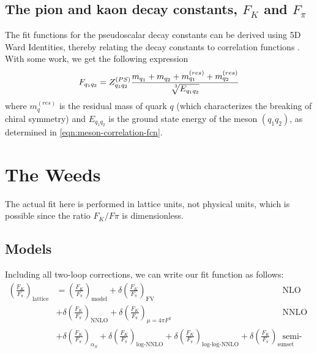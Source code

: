 \documentclass[prd,tightenlines,preprintnumbers,showpacs,superscriptaddress,notitlepage,eqsecnum,floatfix,notitlepage]{revtex4-1}
\begin{document}
\subsection{The pion and kaon decay constants, $F_K$ and $F_\pi$}
The fit functions for the pseudoscalar decay constants can be derived using 5D Ward Identities, thereby relating the decay constants to correlation functions \cite{Berkowitz:2017opd}. With some work, we get the following expression
\begin{equation}
F_{q_1 q_2} = Z^{(PS)}_{q_1 q_2}\frac{m_{q_1} + m_{q_2} + m^{(res)}_{q_1} + m^{(res)}_{q_2} }{\sqrt[\leftroot{-3}\uproot{3}3]{E_{q_1 q_2}}}
\end{equation}
where $m^{(res)}_q$ is the residual mass of quark $q$ (which characterizes the breaking of chiral symmetry) and $E_{q_1 q_2}$ is the ground state energy of the meson $(q_1 q_2)$, as determined in \eqref{eqn:meson-correlation-fcn}.



\section{The Weeds}
The actual fit here is performed in lattice units, not physical units, which is possible since the ratio $F_K / F\pi$ is dimensionless.

\subsection{Models}
Including all two-loop corrections, we can write our fit function as follows:
\begin{align}
\left(\frac{F_K}{F_\pi}\right)_\text{lattice} &=
\left(\frac{F_K}{F_\pi}\right)_\text{model}  + \delta \left(\frac{F_K}{F_\pi}\right)_\text{FV} 
&& \text{NLO + F.V.} \\
&+ \delta \left(\frac{F_K}{F_\pi}\right)_\text{NNLO}  + \delta \left(\frac{F_K}{F_\pi}\right)_{\mu = 4 \pi F^2} 
&& \text{NNLO} \nonumber \\
&+ \delta\left(\frac{F_K}{F_\pi}\right)_{\alpha_S}
+ \delta\left(\frac{F_K}{F_\pi}\right)_{\text{log-NNLO}}
+ \delta\left(\frac{F_K}{F_\pi}\right)_{\text{log-log-NNLO}}
+ \delta\left(\frac{F_K}{F_\pi}\right)_{\text{sunset}} 
&& \text{semi-NNLO} \nonumber
\end{align}
\end{document}
